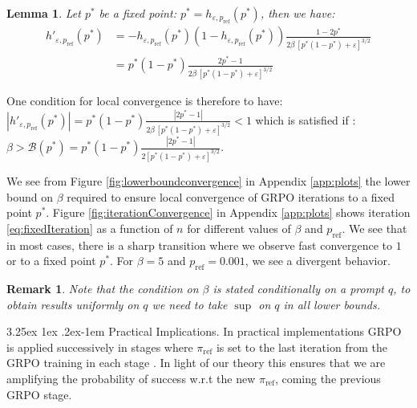 \documentclass[11pt,reqno]{amsart}
\makeatletter
\newtheorem{lemma}{Lemma}
\newtheorem{remark}{Remark}
\providecommand\paragraph{\@startsection{paragraph}{4}{\z@}%
  {3.25ex \@plus1ex \@minus.2ex}{-1em}%
  {\normalfont\normalsize\bfseries}}
\makeatother
\begin{document}
\begin{lemma} Let $p^*$ be a fixed point: $p^*= h_{\varepsilon,p_{\mathrm{ref}}} (p^*)$, then we have:
\begin{align*}
h'_{\varepsilon,p_{\mathrm{ref}}}(p^*)&= - h_{\varepsilon, p_{\mathrm{ref}}}(p^*) (1-h_{\varepsilon, p_{\mathrm{ref}}}(p^*) ) \frac{1-2p^*}{2\beta\,[p^*(1-p^*)+\varepsilon]^{3/2}}\\
&=  p^* (1-p^*) \frac{2p^*-1}{2\beta\,[p^*(1-p^*)+\varepsilon]^{3/2}}\
\end{align*}
\end{lemma}

One condition for local convergence is therefore to have: 
$|h'_{\varepsilon,p_{\mathrm{ref}}}(p^*)| =  p^* (1-p^*) \frac{| 2p^*-1|}{2\beta\,[p^*(1-p^*)+\varepsilon]^{3/2}} <1 $
which is satisfied if : 
$\beta > \mathcal{B}(p^*)=p^* (1-p^*) \frac{| 2p^*-1|}{2[p^*(1-p^*)+\varepsilon]^{3/2}}.$





We see from Figure \ref{fig:lowerboundconvergence} in Appendix \ref{app:plots} the lower bound on \( \beta \) required to ensure local convergence of GRPO iterations to a fixed point \( p^* \). Figure \ref{fig:iterationConvergence} in Appendix  \ref{app:plots} shows iteration \eqref{eq:fixedIteration} as a function of \( n \) for different values of \( \beta \) and \( p_{\mathrm{ref}} \). We see that in most cases, there is a sharp transition where we observe fast convergence to \( 1 \) or to a fixed point \( p^* \). For \( \beta = 5 \) and \( p_{\mathrm{ref}} = 0.001 \), we see a divergent behavior.  






\begin{remark} Note that the condition on $\beta$ is stated conditionally on a prompt $q$, to obtain results uniformly on $q$ we need to take $\sup$ on $q$ in all lower bounds.   
\label{rem:qdependency}
\end{remark}

\paragraph{Practical Implications.}  In practical implementations GRPO is applied successively in stages where $\pi_{\mathrm{ref}}$ is set to the last iteration from the GRPO training in each stage \citep{shao2024deepseekmath}. In light of our theory this ensures that we are amplifying the probability of success w.r.t the new $\pi_{\mathrm{ref}}$, coming the previous GRPO stage. 
\end{document}
